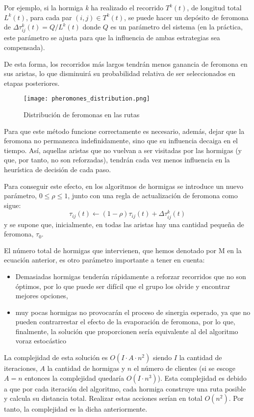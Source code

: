 \documentclass[twocolumn, fontsize=10pt]{article}
\begin{document}
Por ejemplo, si la hormiga \textit{k} ha realizado el recorrido \(T^k(t)\), de longitud total \(L^k(t)\), para cada par \((i,j) \in T^k(t)\), se puede hacer un depósito de feromona de \(\Delta \tau_{ij}^k(t) = Q/L^k(t)\) donde \(Q\) es un parámetro del sistema (en la práctica, este parámetro se ajusta para que la influencia de ambas estrategias sea compensada). \cite{ant}


De esta forma, los recorridos más largos tendrán menos ganancia de feromona en sus aristas, lo que disminuirá su probabilidad relativa de ser seleccionados en etapas posteriores. 

\begin{figure}[h]
    \centering
    \texttt{[image: pheromones\_distribution.png]}
    \caption{Distribución de feromonas en las rutas}
    \label{fig:gadget}
\end{figure}

Para que este método funcione correctamente es necesario, además, dejar que la feromona no permanezca indefinidamente, sino que su influencia decaiga en el tiempo. Así, aquellas aristas que no vuelvan a ser visitadas por las hormigas (y que, por tanto, no son reforzadas), tendrán cada vez menos influencia en la heurística de decisión de cada paso.

Para conseguir este efecto, en los algoritmos de hormigas se introduce un nuevo parámetro, \(0 \leq \rho \leq 1\), junto con una regla de actualización de feromona como sigue:
\[\tau_{ij}(t) \longleftarrow (1-\rho)\tau_{ij}(t) +  \Delta \tau_{ij}^k(t)\]
y se supone que, inicialmente, en todas las aristas hay una cantidad pequeña de feromona, \(\tau_0\).

El número total de hormigas que intervienen, que hemos denotado por {M} en la ecuación anterior, es otro parámetro importante a tener en cuenta:
\begin{itemize}
    \item Demasiadas hormigas tenderán rápidamente a reforzar recorridos que no son óptimos, por lo que puede ser difícil que el grupo los olvide y encontrar mejores opciones,
    \item muy pocas hormigas no provocarán el proceso de sinergia esperado, ya que no pueden contrarrestar el efecto de la evaporación de feromona, por lo que, finalmente, la solución que proporcionen sería equivalente al del algoritmo voraz estocástico \cite{ant}
\end{itemize}

La complejidad de esta solución es \(O(I·A·n^2)\) siendo \(I\) la cantidad de iteraciones, \(A\) la cantidad de hormigas y \(n\) el número de clientes (si se escoge \(A=n\) entonces la complejidad quedaría \(O(I·n^3)\)). Esta complejidad es debido a que por cada iteración del algoritmo, cada hormiga construye una ruta posible y calcula su distancia total. Realizar estas acciones serían en total \(O(n^2)\). Por tanto, la complejidad es la dicha anteriormente.
\end{document}
